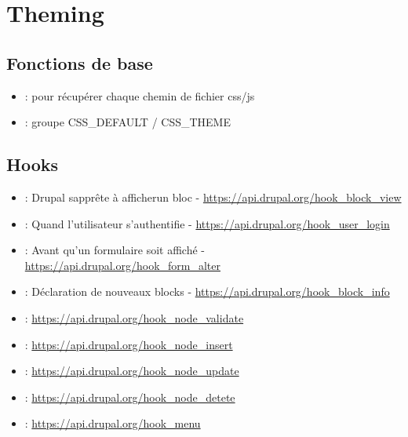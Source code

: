 \documentclass[a4paper,11pt,french]{rtdsphinxmanual}
\begin{document}
\chapter{Theming}
\label{theming::doc}\label{theming:theming}

\section{Fonctions de base}
\label{theming:fonctions-de-base}\begin{itemize}
\item {} 
 : pour récupérer chaque chemin de fichier css/js

\item {} 
 : groupe CSS\_DEFAULT / CSS\_THEME

\end{itemize}


\section{Hooks}
\label{theming:hooks}\begin{itemize}
\item {} 
 : Drupal sapprête à afficherun bloc - \href{https://api.drupal.org/hook\_block\_view}{https://api.drupal.org/hook\_block\_view}

\item {} 
 : Quand l'utilisateur s'authentifie - \href{https://api.drupal.org/hook\_user\_login}{https://api.drupal.org/hook\_user\_login}

\item {} 
 : Avant qu'un formulaire soit affiché - \href{https://api.drupal.org/hook\_form\_alter}{https://api.drupal.org/hook\_form\_alter}

\item {} 
 : Déclaration de nouveaux blocks - \href{https://api.drupal.org/hook\_block\_info}{https://api.drupal.org/hook\_block\_info}

\item {} 
 : \href{https://api.drupal.org/hook\_node\_validate}{https://api.drupal.org/hook\_node\_validate}

\item {} 
 : \href{https://api.drupal.org/hook\_node\_insert}{https://api.drupal.org/hook\_node\_insert}

\item {} 
 : \href{https://api.drupal.org/hook\_node\_update}{https://api.drupal.org/hook\_node\_update}

\item {} 
 : \href{https://api.drupal.org/hook\_node\_detete}{https://api.drupal.org/hook\_node\_detete}

\item {} 
 : \href{https://api.drupal.org/hook\_menu}{https://api.drupal.org/hook\_menu}

\end{itemize}
\end{document}
